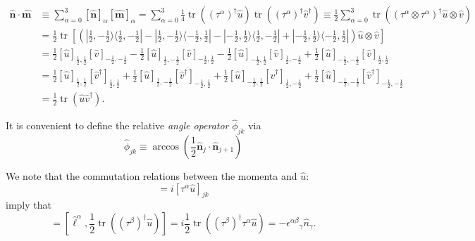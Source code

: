 \documentclass[12pt]{amsart}
\newcommand{\tr}{\operatorname{tr}}
\theoremstyle{definition}
\theoremstyle{remark}
\numberwithin{equation}{section}
\begin{document}
\begin{equation}
	\begin{split}
		\widehat{\mathbf{n}}\cdot \widehat{\mathbf{m}} &\equiv \sum_{\alpha = 0}^3 [\widehat{\mathbf{n}}]_\alpha [\widehat{\mathbf{m}}]_\alpha = \sum_{\alpha = 0}^3 \frac14\tr((\tau^\alpha)^\dag \widehat{u})\tr((\tau^\alpha)^\dag \widehat{v}^\dag) \equiv \frac12\sum_{\alpha = 0}^3 \tr((\tau^\alpha\otimes\tau^\alpha)^\dag \widehat{u}\otimes \widehat{v}) \\
		&=\frac12 \tr\left[ \left(|\tfrac12, -\tfrac12\rangle\langle \tfrac12, -\tfrac12| - |\tfrac12, -\tfrac12\rangle\langle -\tfrac12, \tfrac12| - |-\tfrac12, \tfrac12\rangle\langle \tfrac12, -\tfrac12| + |-\tfrac12, \tfrac12\rangle\langle -\tfrac12, \tfrac12|\right)\widehat{u}\otimes \widehat{v}\right] \\
		&= \frac12 [\widehat{u}]_{\tfrac12,\tfrac12}[\widehat{v}]_{-\tfrac12,-\tfrac12} - \frac12 [\widehat{u}]_{\tfrac12,-\tfrac12}[\widehat{v}]_{-\tfrac12,\tfrac12}-\frac12 [\widehat{u}]_{-\tfrac12,\tfrac12}[\widehat{v}]_{\tfrac12,-\tfrac12}+\frac12 [\widehat{u}]_{-\tfrac12,-\tfrac12}[\widehat{v}]_{\tfrac12,\tfrac12} \\
		&= \frac12 [\widehat{u}]_{\tfrac12,\tfrac12}[\widehat{v}^\dag]_{\tfrac12,\tfrac12} + \frac12 [\widehat{u}]_{\tfrac12,-\tfrac12}[\widehat{v}^\dag]_{-\tfrac12,\tfrac12}+\frac12 [\widehat{u}]_{-\tfrac12,\tfrac12}[\widehat{v}^\dag]_{\tfrac12,-\tfrac12}+\frac12 [\widehat{u}]_{-\tfrac12,-\tfrac12}[\widehat{v}^\dag]_{-\tfrac12,-\tfrac12} \\
		&= \frac12 \tr(\widehat{u}\widehat{v}^\dag). 
	\end{split}
\end{equation}

It is convenient to define the relative \emph{angle operator} $\widehat{\phi}_{jk}$ via
\begin{equation}
	\widehat{\phi}_{jk} \equiv \arccos\left(\frac12\widehat{\mathbf{n}}_j\cdot \widehat{\mathbf{n}}_{j+1}\right)
\end{equation}

We note that the commutation relations between the momenta and $\widehat{u}$:
\begin{equation}
	[\widehat{\ell}^\alpha, \widehat{u}_{jk}] = i[\tau^\alpha \widehat{u}]_{jk}
\end{equation}
imply that 
\begin{equation}
	[\widehat{\ell}^\alpha, \widehat{n}_\beta] = \left[\widehat{\ell}^\alpha, \frac{1}{2}\tr((\tau^\beta)^\dag \widehat{u})\right] = i\frac{1}{2}\tr((\tau^\beta)^\dag\tau^\alpha \widehat{u}) = -{\epsilon^{\alpha\beta}}_\gamma \widehat{n}_\gamma.
\end{equation}
\end{document}
